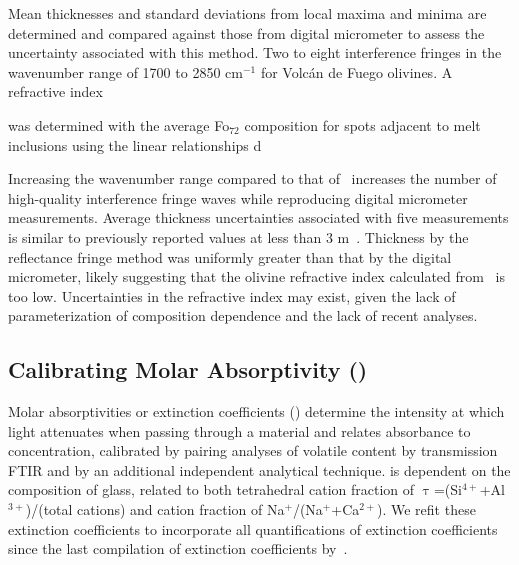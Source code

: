 \documentclass[draft]{agujournal2019}
\begin{document}
Mean thicknesses and standard deviations from local maxima and minima are determined and compared against those from digital micrometer to assess the uncertainty associated with this method. Two to eight interference fringes in the wavenumber range of 1700 to 2850 cm$^{-1}$ for Volcán de Fuego olivines. A refractive index 


was determined with the average Fo$_{72}$ composition for spots adjacent to melt inclusions using the linear relationships d

Increasing the wavenumber range compared to that of~ increases the number of high-quality interference fringe waves while reproducing digital micrometer measurements. Average thickness uncertainties associated with five measurements is similar to previously reported values at less than 3 \textmu m~\cite{Allisonetal2019, NicholsandWysoczanski2007, vonAulocketal2014}. Thickness by the reflectance fringe method was uniformly greater than that by the digital micrometer, likely suggesting that the olivine refractive index calculated from~ is too low. Uncertainties in the refractive index may exist, given the lack of parameterization of composition dependence and the lack of recent analyses.


\subsection{Calibrating Molar Absorptivity (\textepsilon)}
Molar absorptivities or extinction coefficients (\textepsilon) determine the intensity at which light attenuates when passing through a material and relates absorbance to concentration, calibrated by pairing analyses of volatile content by transmission FTIR and by an additional independent analytical technique. \textepsilon is dependent on the composition of glass, related to both tetrahedral cation fraction of $\uptau$=(Si$^{4+}$+Al$^{3+}$)/(total cations) and cation fraction of Na$^{+}$/(Na$^{+}$+Ca$^{2+}$). We refit these extinction coefficients to incorporate all quantifications of extinction coefficients since the last compilation of extinction coefficients by~.
\end{document}
